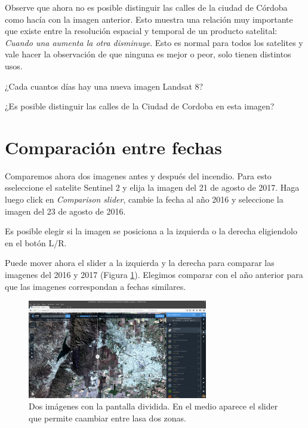 \documentclass[a4paper,10pt]{article}
\begin{document}
Observe que ahora no es posible distinguir las calles de la ciudad de Córdoba como hacía con la imagen anterior. Esto muestra una relación muy importante que existe entre la resolución espacial y temporal de un producto satelital: \emph{Cuando una aumenta la otra disminuye}. Esto es normal para todos los satelites y vale hacer la observación de que ninguna es mejor o peor, solo tienen distintos usos.

\begin{que}
    ¿Cada cuantos días hay una nueva imagen Landsat 8?
\end{que}

\begin{que}
    ¿Es posible distinguir las calles de la Ciudad de Cordoba en esta imagen?
\end{que}

\section{Comparación entre fechas}
Comparemos ahora dos imagenes antes y después del incendio. Para esto sseleccione el satelite Sentinel 2 y elija la imagen del 21 de agosto de 2017. Haga luego click en \emph{Comparison slider}, cambie la fecha al año 2016 y seleccione la imagen del 23 de agosto de 2016.

Es posible elegir si la imagen se posiciona a la izquierda o la derecha eligiendolo en el botón L/R.

Puede mover ahora el slider a la izquierda y la derecha para comparar las imagenes del 2016 y 2017 (Figura \ref{fig:slider}). Elegimos comparar con el año anterior para que las imagenes correspondan a fechas similares.

\begin{figure}[h!]
    \centering
    \includegraphics[width=0.7\textwidth]{fig:slider.png}
    \caption{Dos imágenes con la pantalla dividida. En el medio aparece el slider que permite caambiar entre lasa dos zonas.}
    \label{fig:slider}
\end{figure}
\end{document}
